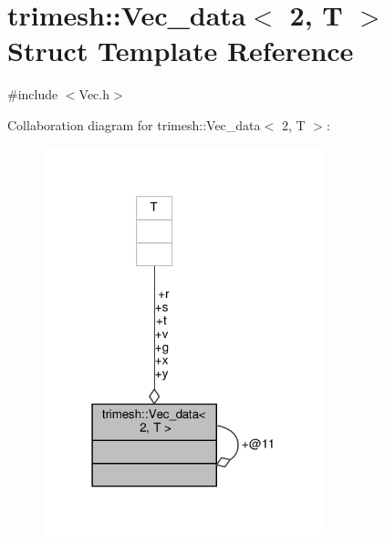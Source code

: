 \hypertarget{structtrimesh_1_1Vec__data_3_012_00_01T_01_4}{}\section{trimesh\+:\+:Vec\+\_\+data$<$ 2, T $>$ Struct Template Reference}
\label{structtrimesh_1_1Vec__data_3_012_00_01T_01_4}


{\ttfamily \#include $<$Vec.\+h$>$}



Collaboration diagram for trimesh\+:\+:Vec\+\_\+data$<$ 2, T $>$\+:\nopagebreak
\begin{figure}[H]
\begin{center}
\leavevmode
\includegraphics[width=231pt]{d8/d7f/structtrimesh_1_1Vec__data_3_012_00_01T_01_4__coll__graph}
\end{center}
\end{figure}
